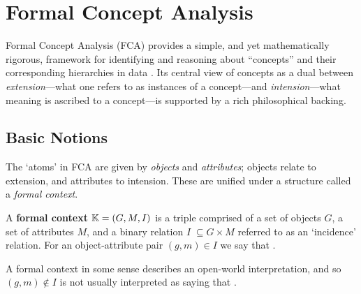 \chapter{Formal Concept Analysis}
\label{chapter:formal-concept-analysis}

Formal Concept Analysis (FCA) provides a simple, and yet mathematically rigorous, framework for identifying and reasoning about ``concepts'' and their corresponding hierarchies in data \cite{ganter1999formal,ganter2016conceptual}. Its central view of concepts as a dual between \textit{extension}---what one refers to as instances of a concept---and \textit{intension}---what meaning is ascribed to a concept---is supported by a rich philosophical backing. 

\section{Basic Notions}
\label{section:basic-notions}
The `atoms' in FCA are given by \textit{objects} and \textit{attributes}; objects relate to extension, and attributes to intension. These are unified under a structure called a \textit{formal context}.

\begin{definition}
  \label{definition:formal-context}
  A \textbf{formal context} $\mathbb{K} = (G,M,I)$ is a triple comprised of a set of objects $G$, a set of attributes $M$, and a binary relation $I \; \subseteq G \times M$ referred to as an `incidence' relation. For an object-attribute pair $(g,m) \in I$ we say that .
\end{definition}

A formal context  in some sense describes an open-world interpretation, and so $(g,m) \not \in I$ is not usually interpreted as saying that .

